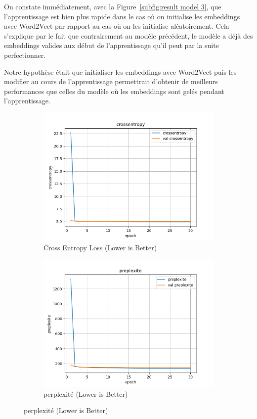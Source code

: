 \documentclass[a4paper]{article}
\begin{document}
On constate immédiatement, avec la Figure~\ref{subfig:result model 3}, que l'apprentissage est bien plus rapide dans le cas où on 
initialise les embeddings avec Word2Vect par rapport au cas où on les initialise aléatoirement. Cela s'explique par le fait que 
contrairement au modèle précédent, le modèle a déjà des embeddings valides aux début de l'apprentissage qu'il peut par la suite 
perfectionner.

Notre hypothèse était que initialiser les embeddings avec Word2Vect puis les modifier au cours de l'apprentissage permettrait 
d'obtenir de meilleurs performances que celles du modèle où les embeddings sont gelés pendant l'apprentissage. 


\begin{figure}[ht]
  \centering
  \begin{subfigure}{0.47\textwidth}
    \includegraphics[width=\linewidth]{../logs/learnfromword2vect_0/crossentropy.png}
    \caption{Cross Entropy Loss (Lower is Better)}
  \end{subfigure}
  \hfill
  \begin{subfigure}{0.47\textwidth}
    \includegraphics[width=\linewidth]{../logs/learnfromword2vect_0/preplexite.png}
    \caption{perplexité (Lower is Better)}
  \end{subfigure}


\end{figure}
\end{document}
